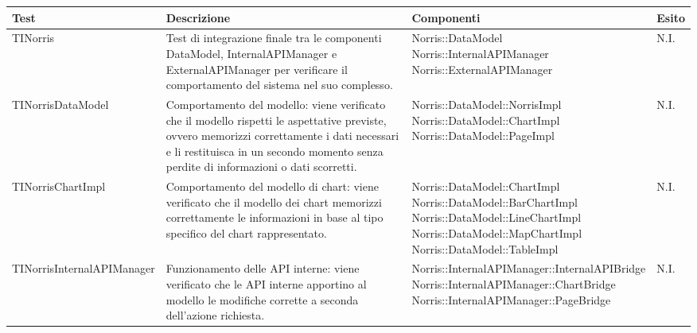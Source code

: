\begin{table}[H]
	\begin{center}
		\begin{longtabu}{| p{0.30\textwidth} |p{0.24\textwidth} |p{0.35\textwidth} | p{0.05\textwidth} |}
			\hline
			Test 					& Descrizione				& Componenti				 & Esito 					\\ \hline




	TINorris
	&
Test di integrazione finale tra le componenti DataModel, InternalAPIManager e ExternalAPIManager per verificare il comportamento del sistema nel suo complesso.
& \parbox[t]{0.6\textwidth}{
Norris::DataModel\\
Norris::InternalAPIManager\\
Norris::ExternalAPIManager}
			& N.I.
			\\ \hline



	TINorrisDataModel
	&
Comportamento del modello: viene verificato che il modello rispetti le aspettative previste, ovvero memorizzi correttamente i dati necessari e li restituisca in un secondo momento senza perdite di informazioni o dati scorretti.
& \parbox[t]{0.6\textwidth}{
Norris::DataModel::NorrisImpl\\
Norris::DataModel::ChartImpl\\
Norris::DataModel::PageImpl}
			& N.I.
			\\ \hline



	TINorrisChartImpl
	&
Comportamento del modello di chart: viene verificato che il modello dei chart memorizzi correttamente le informazioni in base al tipo specifico del chart rappresentato.
& \parbox[t]{0.6\textwidth}{
Norris::DataModel::ChartImpl\\
Norris::DataModel::BarChartImpl\\
Norris::DataModel::LineChartImpl\\
Norris::DataModel::MapChartImpl\\
Norris::DataModel::TableImpl}
			& N.I.
			\\ \hline



	TINorrisInternalAPIManager
	&
Funzionamento delle API interne: viene verificato che le API interne apportino al modello le modifiche corrette a seconda dell'azione richiesta.
& \parbox[t]{0.6\textwidth}{
Norris::InternalAPIManager::InternalAPIBridge\\
Norris::InternalAPIManager::ChartBridge\\
Norris::InternalAPIManager::PageBridge}
			& N.I.
			\\ \hline




\end{longtabu}
\end{center}
\end{table}
